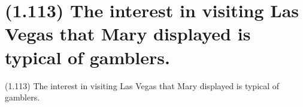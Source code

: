 \documentclass{article}
\begin{document}
\clearpage

%
%

\section*{(1.113) The interest in visiting Las Vegas that Mary displayed is typical of gamblers.}

\bigbreak
\begin{enumerate*}
\item[(1.113)] The interest in visiting Las Vegas that Mary displayed is typical of gamblers.
\end{enumerate*}
\bigbreak
\end{document}
